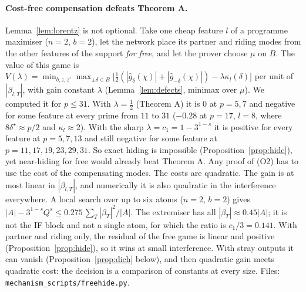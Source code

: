 \documentclass[11pt]{article}
\theoremstyle{definition}
\begin{document}
\paragraph{Cost-free compensation defeats Theorem A.}  Lemma~\ref{lem:lorentz} is not optional.  Take one cheap feature $l$ of a programme
maximiser ($n=2$, $b=2$), let the network place its partner and riding modes from the other features of the support \emph{for free}, and let the
prover choose $\mu$ on $B$.  The value of this game is
$V(\lambda)=\min_{b,z,z'}\max_{\pm\delta\in B}\big[\frac12(|\hat g_\delta(\chi)|+|\hat g_{-\delta}(\chi)|)-\lambda\kappa_l(\delta)\big]$ per unit of $|\beta_{l,T}|$, with
gain constant $\lambda$ (Lemma~\ref{lem:defects}, minimax over $\mu$).  We computed it for $p\le31$.  With $\lambda=\frac12$ (Theorem A) it is $0$ at $p=5,7$ and
negative for some feature at every prime from $11$ to $31$ ($-0.28$ at $p=17$, $l=8$, where $8\delta^\star\approx p/2$ and $\kappa_l\approx2$).  With the
sharp $\lambda=c_1=1-3^{1-s}$ it is positive for every feature at $p=5,7,13$ and still negative for some feature at $p=11,17,19,23,29,31$.  So exact
hiding is impossible (Proposition~\ref{prop:hide}), yet near-hiding for free would already beat Theorem A.  Any proof of (O2) has to use the cost of the
compensating modes.  The costs are quadratic.  The gain is at most linear in $|\beta_{l,T}|$, and numerically it is also quadratic in the
interference everywhere.  A local search over up to six atoms ($n=2$, $b=2$) gives $|A|-3^{1-s}Q^s\le0.275\,\sum_T|\beta_T|^2/|A|$.  The extremiser
has all $|\beta_T|\approx0.45|A|$; it is not the IF block and not a single atom, for which the ratio is $c_1/3=0.141$.  With partner and riding only, the residual
of the free game is linear and positive (Proposition~\ref{prop:hide}), so it wins at small interference.  With stray outputs it can vanish
(Proposition~\ref{prop:dich} below), and then quadratic gain meets quadratic cost: the decision is a comparison of constants at every size.  Files: \texttt{mechanism\_scripts/freehide.py}.
\end{document}
